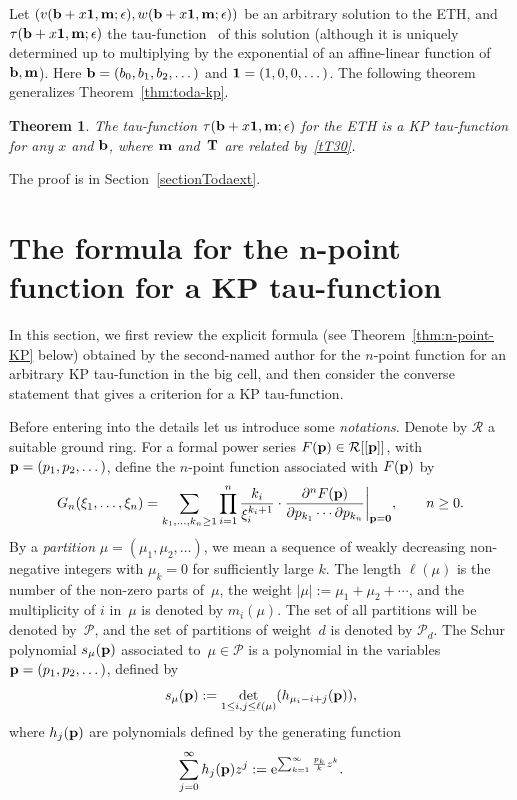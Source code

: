 \documentclass[11pt]{article}
\numberwithin{equation}{section}
\newcommand{\e}{\epsilon}
\newcommand{\pd}{\partial}
\newcommand{\beq}{\begin{equation}}
\newcommand{\eeq}{\end{equation}}
\numberwithin{equation}{section}
\newtheorem{Theorem}{Theorem}[section]
\begin{document}
Let $(v({\bf b}+x{\bf 1}, {\bf m}; \e), w({\bf b}+x{\bf 1}, {\bf m}; \e) )$ be an arbitrary solution
to the ETH, and $\tau({\bf b}+x{\bf 1},{\bf m}; \e)$ the tau-function~\cite{CDZ} of this solution
(although it is uniquely determined up to multiplying by
the exponential of an affine-linear function of ${\bf b}, {\bf m}$). %
Here ${\bf b}=(b_0,b_1,b_2,\dots)$ and ${\bf 1}=(1, 0, 0, \dots)$.
The following theorem
generalizes Theorem~\ref{thm:toda-kp}.
\begin{Theorem} \label{thm:toda-kp-ext}
The tau-function $\tau({\bf b}+x{\bf 1},{\bf m};\e)$ for the ETH
is a KP tau-function for any $x$ and ${\bf b}$, where ${\bf m}$ and~${\bf T}$ are related by~\eqref{tT30}.
\end{Theorem}
The proof is in Section~\ref{sectionTodaext}.


\section[The formula for the n-point function for a KP tau-function]{The formula for the $\boldsymbol{n}$-point function for a KP tau-function}\label{sectionKP}

In this section, we first review the explicit formula (see Theorem~\ref{thm:n-point-KP} below) obtained by the second-named author
for the $n$-point function for an arbitrary KP tau-function in the big cell, and then consider the converse statement that
gives a criterion for a KP tau-function.

Before entering into the details let us introduce some {\it notations}.
Denote by $\mathcal{R}$ a suitable ground ring.
For a formal power series $F({\bf p})\in \mathcal{R}[[{\bf p}]]$,
with ${\bf p}=(p_1,p_2,\dots)$, define the $n$-point function associated with $F({\bf p})$ by
\[
G_n(\xi_1, \dots, \xi_n) = \sum_{k_1,\dots,k_n\ge1} \prod_{i=1}^n \frac{k_i}{\xi_i^{k_i+1}} \cdot
\frac{\pd^n F({\bf p})}{\pd p_{k_1} \cdots \pd p_{k_n}}\biggr|_{{\bf p} = {\bf 0}}, \qquad n\ge0.
\]
By a {\it partition} $\mu=(\mu_1,\mu_2,\dots)$, we mean a sequence of
weakly decreasing non-negative integers with $\mu_k=0$
 for sufficiently large $k$.
 The length $\ell(\mu)$ is the number of the non-zero parts of~$\mu$, the weight $|\mu|:=\mu_1+\mu_2+\cdots$,
 and the multiplicity of $i$ in~$\mu$ is denoted by $m_i(\mu)$.
 The set of all partitions will be denoted by~$\mathcal{P}$, and the set of partitions of weight~$d$ is denoted by $\mathcal{P}_d$.
 The
Schur polynomial $s_{\mu}({\bf p})$ associated to~$\mu\in\mathcal{P}$ is a polynomial in the variables
${\bf p} = (p_1,p_2,\dots)$,
defined by
\beq\label{defSchur1}
s_{\mu}({\bf p}) := \det_{1\leq i,j \leq \ell(\mu)}(h_{\mu_i-i+j}({\bf p})),
\eeq
where $h_j({\bf p})$ are polynomials defined by the generating function
\[
\sum_{j=0}^{\infty}h_j({\bf p})z^j := {\rm e}^{\sum_{k=1}^{\infty} \frac{p_k}{k} z^k}.
\]
\end{document}

